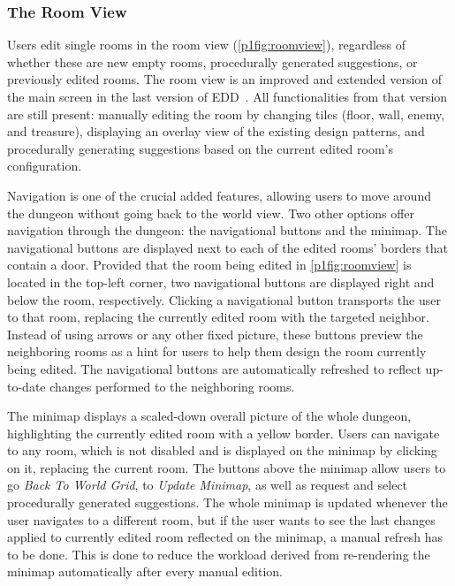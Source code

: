 \subsubsection{The Room View}



Users edit single rooms in the room view (\cref{p1fig:roomview}), regardless of whether these are new empty rooms, procedurally generated suggestions, or previously edited rooms. The room view is an improved and extended version of the main screen in the last version of EDD~. All functionalities from that version are still present: manually editing the room by changing tiles (floor, wall, enemy, and treasure), displaying an overlay view of the existing design patterns, and procedurally generating suggestions based on the current edited room's configuration.

Navigation is one of the crucial added features, allowing users to move around the dungeon without going back to the world view. Two other options offer navigation through the dungeon: the navigational buttons and the minimap. The navigational buttons are displayed next to each of the edited rooms' borders that contain a door. Provided that the room being edited in \cref{p1fig:roomview} is located in the top-left corner, two navigational buttons are displayed right and below the room, respectively. Clicking a navigational button transports the user to that room, replacing the currently edited room with the targeted neighbor. Instead of using arrows or any other fixed picture, these buttons preview the neighboring rooms as a hint for users to help them design the room currently being edited. The navigational buttons are automatically refreshed to reflect up-to-date changes performed to the neighboring rooms.  

The minimap displays a scaled-down overall picture of the whole dungeon, highlighting the currently edited room with a yellow border. Users can navigate to any room, which is not disabled and is displayed on the minimap by clicking on it, replacing the current room. The buttons above the minimap allow users to go \textit{Back To World Grid}, to \textit{Update Minimap}, as well as request and select procedurally generated suggestions. The whole minimap is updated whenever the user navigates to a different room, but if the user wants to see the last changes applied to currently edited room reflected on the minimap, a manual refresh has to be done. This is done to reduce the workload derived from re-rendering the minimap automatically after every manual edition.

